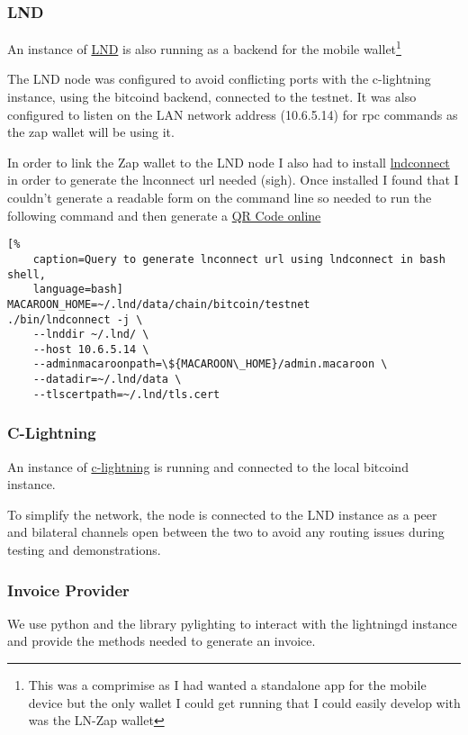 \documentclass[a4paper]{article}
\begin{document}
\subsubsection{LND}
An instance of \href{https://github.com/lightningnetwork/lnd}{LND} is also running as
a backend for the mobile wallet\footnote{This was a comprimise as I had wanted a
standalone app for the mobile device but the only wallet I could get running that I
could easily develop with was the LN-Zap wallet}

The LND node was configured to avoid conflicting ports with the c-lightning instance,
using the bitcoind backend, connected to the testnet.  It was also configured to
listen on the LAN network address (10.6.5.14) for rpc commands as the zap wallet
will be using it.

In order to link the Zap wallet to the LND node I also had to install
\href{https://github.com/LN-Zap/lndconnect}{lndconnect} in order to generate the
lnconnect url needed (sigh).  Once installed I found that I couldn't generate a
readable form on the command line so needed to run the following command and then
generate a \href{https://www.online-qrcode-generator.com/}{QR Code online}

\begin{lstlisting}[%
	caption=Query to generate lnconnect url using lndconnect in bash shell,
	language=bash]
MACAROON_HOME=~/.lnd/data/chain/bitcoin/testnet
./bin/lndconnect -j \
	--lnddir ~/.lnd/ \
	--host 10.6.5.14 \
	--adminmacaroonpath=\${MACAROON\_HOME}/admin.macaroon \
	--datadir=~/.lnd/data \
	--tlscertpath=~/.lnd/tls.cert
\end{lstlisting}

\subsubsection{C-Lightning}
An instance of \href{https://github.com/ElementsProject/lightning}{c-lightning} is
running and connected to the local bitcoind instance.

To simplify the network, the node is connected to the LND instance as a peer and
bilateral channels open between the two to avoid any routing issues during testing
and demonstrations.

\subsubsection{Invoice Provider}
We use python and the library pylighting to interact with the lightningd instance and
provide the methods needed to generate an invoice.
\end{document}
